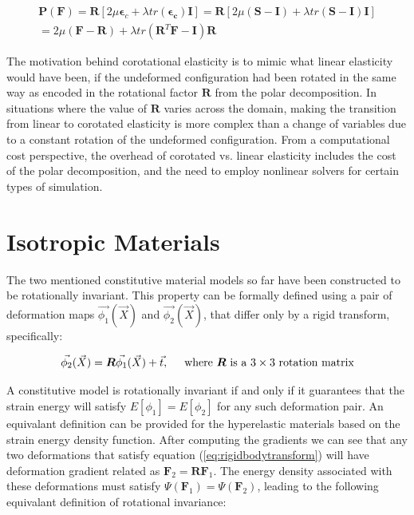\begin{gather*}
\boldsymbol{P}(\boldsymbol{F})=\boldsymbol{R} \left[ 2\mu \boldsymbol{\epsilon}_c + \lambda tr(\boldsymbol{\epsilon_c}) \boldsymbol{I} \right]=
\boldsymbol{R} \left[ 2\mu (\boldsymbol{S - I}) + \lambda tr(\boldsymbol{S - I}) \boldsymbol{I} \right] \\
= 2 \mu (\boldsymbol{F-R}) + \lambda tr(\boldsymbol{R}^T\boldsymbol{F} - \boldsymbol{I})\boldsymbol{R}
\end{gather*}

The motivation behind corotational elasticity is to mimic what linear elasticity would have been, if the undeformed configuration had been rotated in the same way
as encoded in the rotational factor $\boldsymbol{R}$ from the polar decomposition. In situations where the value of $\boldsymbol{R}$ varies across the domain, 
making the transition from linear to corotated elasticity is more complex than a change of variables due to a constant rotation of the undeformed configuration. 
From a computational cost perspective, the overhead of corotated vs. linear elasticity includes the cost of the polar decomposition, and the need to employ nonlinear
solvers for certain types of simulation. 

\section{Isotropic Materials}
The two mentioned constitutive material models so far have been constructed to be rotationally invariant. This property can be formally defined using a pair of 
deformation maps $\vec{\phi_1}(\vec{X})$ and $\vec{\phi_2}(\vec{X})$, that differ only by a rigid transform, specifically:

\begin{equation}
\label{eq:rigidbodytransform}
 \vec{\phi_2}(\vec{X}) = \boldsymbol{R} \vec{\phi_1}(\vec{X}) + \vec{t}, \hspace{5mm} \text{where $\boldsymbol{R}$ is a $3\times 3$ rotation matrix}
\end{equation}

A constitutive model is rotationally invariant if and only if it guarantees that the strain energy will satisfy $E\left[ \phi_1 \right] = E\left[ \phi_2 \right]$
for any such deformation pair. An equivalant definition can be provided for the hyperelastic materials based on the strain energy density function. 
After computing the gradients we can see that any two deformations that satisfy equation (\ref{eq:rigidbodytransform}) will have deformation gradient related as
$\boldsymbol{F}_2=\boldsymbol{R}\boldsymbol{F}_1$. The energy density associated with these deformations must satisfy $\Psi(\boldsymbol{F}_1)=\Psi(\boldsymbol{F}_2)$,
leading to the following equivalant definition of rotational invariance:\\

